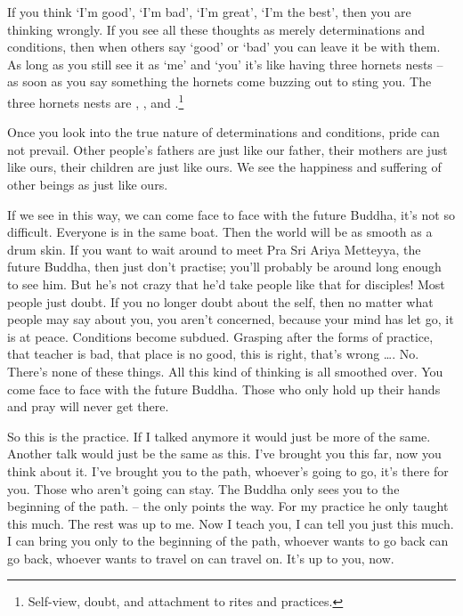 If you think `I'm good', `I'm bad', `I'm great', `I'm the best', then you are thinking wrongly. If you see all these thoughts as merely determinations and conditions, then when others say `good' or `bad' you can leave it be with them. As long as you still see it as `me' and `you' it's like having three hornets nests -- as soon as you say something the hornets come buzzing out to sting you. The three hornets nests are , , and .\footnote{Self-view, doubt, and attachment to rites and practices.}

Once you look into the true nature of determinations and conditions, pride can not prevail. Other people's fathers are just like our father, their mothers are just like ours, their children are just like ours. We see the happiness and suffering of other beings as just like ours.

If we see in this way, we can come face to face with the future Buddha, it's not so difficult. Everyone is in the same boat. Then the world will be as smooth as a drum skin. If you want to wait around to meet Pra Sri Ariya Metteyya, the future Buddha, then just don't practise; you'll probably be around long enough to see him. But he's not crazy that he'd take people like that for disciples! Most people just doubt. If you no longer doubt about the self, then no matter what people may say about you, you aren't concerned, because your mind has let go, it is at peace. Conditions become subdued. Grasping after the forms of practice, that teacher is bad, that place is no good, this is right, that's wrong \ldots{}. No. There's none of these things. All this kind of thinking is all smoothed over. You come face to face with the future Buddha. Those who only hold up their hands and pray will never get there.

So this is the practice. If I talked anymore it would just be more of the same. Another talk would just be the same as this. I've brought you this far, now you think about it. I've brought you to the path, whoever's going to go, it's there for you. Those who aren't going can stay. The Buddha only sees you to the beginning of the path.  -- the  only points the way. For my practice he only taught this much. The rest was up to me. Now I teach you, I can tell you just this much. I can bring you only to the beginning of the path, whoever wants to go back can go back, whoever wants to travel on can travel on. It's up to you, now.

